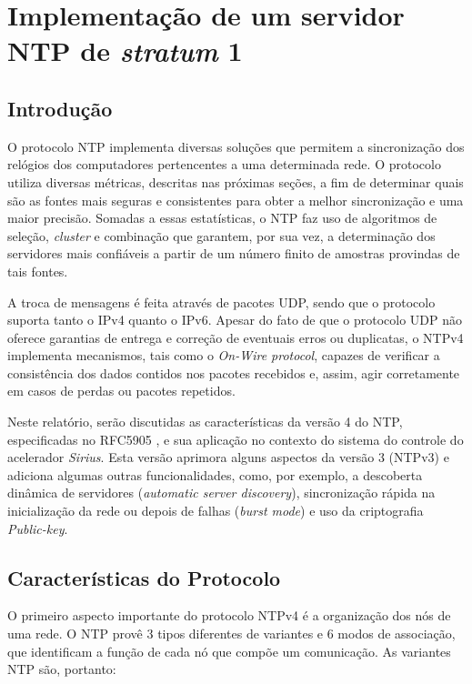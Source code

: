 \section {Implementação de um servidor NTP de \textit{stratum} 1}

\subsection {Introdução}

O protocolo NTP implementa diversas soluções que permitem a sincronização dos
relógios dos computadores pertencentes a uma determinada rede. O protocolo
utiliza diversas métricas, descritas nas próximas seções, a fim de determinar
quais são as fontes mais seguras e consistentes para obter a melhor
sincronização e uma maior precisão. Somadas a essas estatísticas, o NTP faz uso
de algoritmos de seleção, \textit{cluster} e combinação que garantem, por sua
vez, a determinação dos servidores mais confiáveis a partir de um número finito
de amostras provindas de tais fontes. 

\vspace{12pt}

A troca de mensagens é feita através de pacotes UDP, sendo que o protocolo
suporta tanto o IPv4 quanto o IPv6. Apesar do fato de que o protocolo UDP não
oferece garantias de entrega e correção de eventuais erros ou duplicatas, o
NTPv4 implementa mecanismos, tais como o \textit{On-Wire protocol}, capazes de
verificar a consistência dos dados contidos nos pacotes recebidos e, assim,
agir corretamente em casos de perdas ou pacotes repetidos. 

\vspace{12pt}

Neste relatório, serão discutidas as características da versão 4 do NTP,
especificadas no RFC5905 \cite{ntpv4rtp}, e sua aplicação no contexto do sistema
do controle do acelerador \textit{Sirius}. Esta versão aprimora alguns aspectos
da versão 3 (NTPv3) e adiciona algumas outras funcionalidades, como, por exemplo, a
descoberta dinâmica de servidores (\textit{automatic server discovery}),
sincronização rápida na inicialização da rede ou depois de falhas (\textit{burst
mode}) e uso da criptografia \textit{Public-key}.

\subsection {Características do Protocolo}

O primeiro aspecto importante do protocolo NTPv4 é a organização dos
nós de uma rede. O NTP provê 3 tipos diferentes de variantes 
e 6 modos de associação, que identificam a função de cada nó que
compõe um comunicação. As variantes NTP são, portanto:

